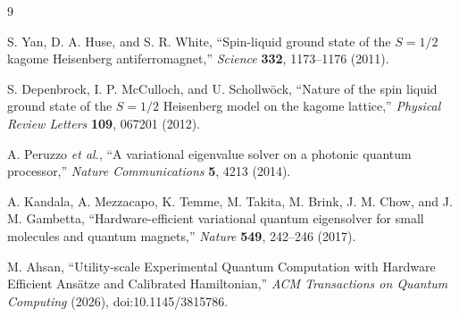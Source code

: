 \documentclass[10pt]{article}
\begin{document}
\small
\begin{thebibliography}{9}
\setlength{\itemsep}{0.08em}

S. Yan, D. A. Huse, and S. R. White,
``Spin-liquid ground state of the $S=1/2$ kagome Heisenberg antiferromagnet,''
\emph{Science} \textbf{332}, 1173--1176 (2011).

S. Depenbrock, I. P. McCulloch, and U. Schollw\"ock,
``Nature of the spin liquid ground state of the $S=1/2$ Heisenberg model on the kagome lattice,''
\emph{Physical Review Letters} \textbf{109}, 067201 (2012).

A. Peruzzo \emph{et al.},
``A variational eigenvalue solver on a photonic quantum processor,''
\emph{Nature Communications} \textbf{5}, 4213 (2014).

A. Kandala, A. Mezzacapo, K. Temme, M. Takita, M. Brink, J. M. Chow, and J. M. Gambetta,
``Hardware-efficient variational quantum eigensolver for small molecules and quantum magnets,''
\emph{Nature} \textbf{549}, 242--246 (2017).

M. Ahsan,
``Utility-scale Experimental Quantum Computation with Hardware Efficient Ans\"atze and Calibrated Hamiltonian,''
\emph{ACM Transactions on Quantum Computing} (2026), doi:10.1145/3815786.

\end{thebibliography}
\end{document}
